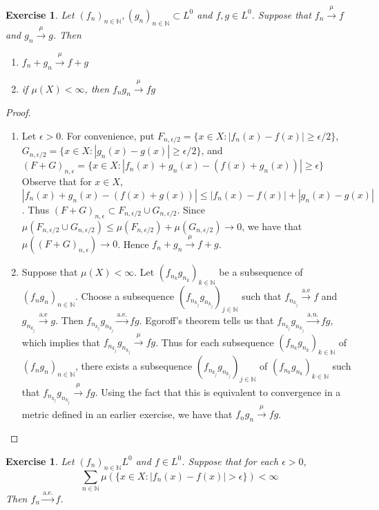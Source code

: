 \documentclass[12pt]{amsart}
\newtheorem{ex}[thm]{Exercise}
\newcommand{\ep}{\epsilon}
\newcommand{\N}{\mathbb{N}}
\newcommand{\convt}[1]{\xrightarrow{\text{#1}}}
\newcommand{\conv}[1]{\xrightarrow{#1}}
\begin{document}
\begin{ex}
Let $(f_n)_{n \in \N}, (g_n)_{n \in \N} \subset L^0$ and $f,g \in L^0$. Suppose that $f_n \conv{\mu} f$ and $g_n \conv{\mu}g$. Then 
\begin{enumerate}
\item $f_n + g_n \conv{\mu} f+g$
\item if $\mu(X) < \infty$, then $f_n g_n \conv{\mu} fg$
\end{enumerate}
\end{ex}

\begin{proof}

\begin{enumerate}
\item Let $\ep > 0$. For convenience, put $F_{n,\ep/2} = \{x \in X: |f_n(x) - f(x)| \geq \ep/2\}$, $G_{n, \ep/2} = \{x \in X: |g_n(x) - g(x)| \geq \ep/2\}$, and $(F+G)_{n,\ep} = \{x \in X: |f_n(x)+g_n(x) - (f(x) + g_n(x))| \geq \ep\}$ Observe that for $x \in X$, $|f_n(x) + g_n(x) - (f(x) + g(x))| \leq |f_n(x) - f(x)| + |g_n(x) - g(x)|$. Thus $(F+G)_{n,\ep} \subset F_{n,\ep/2} \cup G_{n, \ep/2}$. Since $\mu(F_{n,\ep/2} \cup G_{n, \ep/2}) \leq \mu(F_{n,\ep/2}) + \mu(G_{n, \ep/2}) \rightarrow 0$, we have that $\mu((F+G)_{n,\ep}) \rightarrow 0$. Hence $f_n + g_n \conv{\mu} f+g$.

\item Suppose that $\mu(X) < \infty$. Let $(f_{n_k}g_{n_k})_{k \in \N}$ be a subsequence of $(f_ng_n)_{n \in \N}$. Choose a subsequence $(f_{n_{k_j}}g_{n_{k_j}})_{j \in \N}$ such that $f_{n_{k_j}} \convt{a.e} f$ and $g_{n_{k_j}} \convt{a.e} g$. Then $f_{n_{k_j}}g_{n_{k_j}} \convt{a.e.} fg$. Egoroff's theorem tells us that $f_{n_{k_j}}g_{n_{k_j}} \convt{a.u.} fg$, which implies that $f_{n_{k_j}}g_{n_{k_j}} \conv{\mu} fg$. Thus for each subsequence $(f_{n_k}g_{n_k})_{k \in \N}$ of $(f_ng_n)_{n \in \N}$, there exists a subsequence $(f_{n_{k_j}}g_{n_{k_j}})_{j \in \N}$ of $(f_{n_k}g_{n_k})_{k \in \N}$ such that $f_{n_{k_j}}g_{n_{k_j}} \conv{\mu} fg$. Using the fact that this is equivalent to convergence in a metric defined in an earlier exercise,
we have that $f_ng_n \conv{\mu} fg$.
\end{enumerate}

\end{proof}

\begin{ex}
Let $(f_n)_{n \in \N} L^0$ and $f \in L^0$. Suppose that for each $\ep >0$, $$\sum_{n \in \N}\mu(\{x \in X: |f_n(x)-f(x)| > \ep\}) < \infty$$
Then $f_n \convt{a.e.} f$.
\end{ex}
\end{document}
